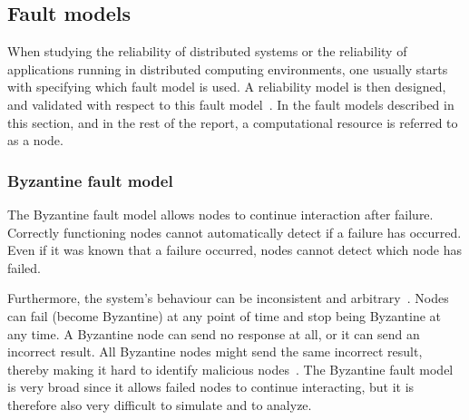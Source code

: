 \documentclass{cslthse-msc}
\begin{document}

\subsection{Fault models} \label{subsec:background_fault_models}
When studying the reliability of distributed systems or the reliability of applications running in distributed computing environments, one usually starts with specifying which fault model is used. A reliability model is then designed, and validated with respect to this fault model~\cite{faultTolerantFundamentals}. In the fault models described in this section, and in the rest of the report, a computational resource is referred to as a node.

\subsubsection{Byzantine fault model} \label{subsub:background_byzantine}
The Byzantine fault model allows nodes to continue interaction after failure. Correctly functioning nodes cannot automatically detect if a failure has occurred. Even if it was known that a failure occurred, nodes cannot detect which node has failed. 

Furthermore, the system's behaviour can be inconsistent and arbitrary~\cite{surveyFaultParallel}. Nodes can fail (become Byzantine) at any point of time and stop being Byzantine at any time. A Byzantine node can send no response at all, or it can send an incorrect result. All Byzantine nodes might send the same incorrect result, thereby making it hard to identify malicious nodes~\cite{selfAdaptRel}. %
The Byzantine fault model is very broad since it allows failed nodes to continue interacting, but it is therefore also very difficult to simulate and to analyze.

\end{document}
